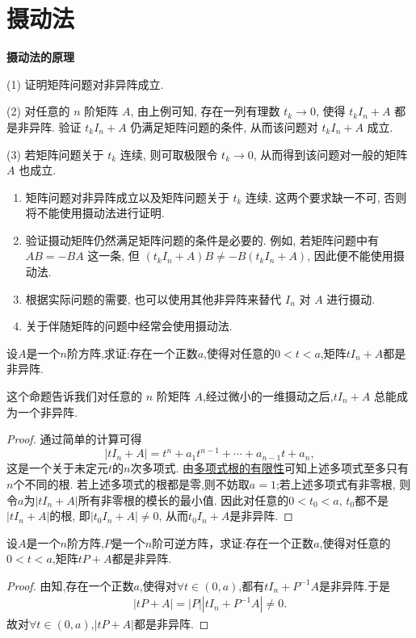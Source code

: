 \documentclass[../../main.tex]{subfiles}%
\begin{document}
\section{摄动法}
\textbf{摄动法的原理}

(1) 证明矩阵问题对非异阵成立.

(2) 对任意的 \(n\) 阶矩阵 \(A\), 由上例可知, 存在一列有理数 \(t_k\rightarrow0\), 使得 \(t_kI_n + A\) 都是非异阵. 验证 \(t_kI_n + A\) 仍满足矩阵问题的条件, 从而该问题对 \(t_kI_n + A\) 成立.

(3) 若矩阵问题关于 \(t_k\) 连续, 则可取极限令 \(t_k\rightarrow0\), 从而得到该问题对一般的矩阵 \(A\) 也成立.

\begin{remark}
\begin{enumerate}
\item 矩阵问题对非异阵成立以及矩阵问题关于 \(t_k\) 连续, 这两个要求缺一不可, 否则将不能使用摄动法进行证明.
\item 验证摄动矩阵仍然满足矩阵问题的条件是必要的. 例如, 若矩阵问题中有 \(AB=-BA\) 这一条, 但 \((t_kI_n + A)B\neq -B(t_kI_n + A)\), 因此便不能使用摄动法.
\item 根据实际问题的需要, 也可以使用其他非异阵来替代 \(I_n\) 对 \(A\) 进行摄动.

\item 关于伴随矩阵的问题中经常会使用摄动法.
\end{enumerate}
\end{remark}

\begin{proposition}\label{proposition:摄动法基本命题}
设\(A\)是一个\(n\)阶方阵,求证:存在一个正数\(a\),使得对任意的\(0 < t < a\),矩阵\(tI_n+A\)都是非异阵. 
\end{proposition}
\begin{remark}
这个命题告诉我们对任意的 \(n\) 阶矩阵 \(A\),经过微小的一维摄动之后,\(tI_n + A\) 总能成为一个非异阵.
\end{remark}
\begin{proof}
通过简单的计算可得
\[
|tI_n + A| = t^n + a_1t^{n - 1}+\cdots+a_{n - 1}t + a_n,
\]
这是一个关于未定元\(t\)的\(n\)次多项式. 由\hyperref[proposition:多项式根的有限性]{多项式根的有限性}可知上述多项式至多只有\(n\)个不同的根. 若上述多项式的根都是零,则不妨取\(a = 1\);若上述多项式有非零根, 则令\(a\)为\(|tI_n + A|\)所有非零根的模长的最小值. 因此对任意的\(0 < t_0 < a\), \(t_0\)都不是\(|tI_n + A|\)的根, 即\(|t_0I_n + A|\neq0\), 从而\(t_0I_n + A\)是非异阵.
\end{proof}

\begin{corollary}\label{corollary:矩阵可逆摄动的推论}
设\(A\)是一个\(n\)阶方阵,$P$是一个$n$阶可逆方阵，求证:存在一个正数\(a\),使得对任意的\(0 < t < a\),矩阵\(tP+A\)都是非异阵. 
\end{corollary}
\begin{proof}
由知,存在一个正数$a$,使得对$\forall t\in (0,a)$,都有$tI_n+P^{-1}A$是非异阵.于是
\begin{align*}
|tP+A|=|P||tI_n+P^{-1}A|\ne 0.
\end{align*}
故对$\forall t\in (0,a)$,$|tP+A|$都是非异阵.
\end{proof}
\end{document}
